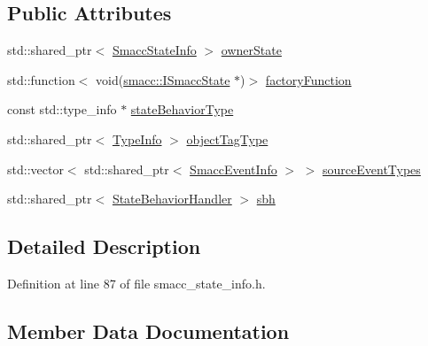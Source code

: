 \subsection*{Public Attributes}
\begin{DoxyCompactItemize}
\item 
std\+::shared\+\_\+ptr$<$ \hyperlink{classsmacc_1_1introspection_1_1SmaccStateInfo}{Smacc\+State\+Info} $>$ \hyperlink{structsmacc_1_1introspection_1_1SmaccStateBehaviorInfo_a3a8978a085abb4e649ac4d3a13bd8257}{owner\+State}
\item 
std\+::function$<$ void(\hyperlink{classsmacc_1_1ISmaccState}{smacc\+::\+I\+Smacc\+State} $\ast$)$>$ \hyperlink{structsmacc_1_1introspection_1_1SmaccStateBehaviorInfo_a966cf5a5fe5cbe839be792b04e6c7368}{factory\+Function}
\item 
const std\+::type\+\_\+info $\ast$ \hyperlink{structsmacc_1_1introspection_1_1SmaccStateBehaviorInfo_a85dc84a01fbd0b830ed6598996c4a7c9}{state\+Behavior\+Type}
\item 
std\+::shared\+\_\+ptr$<$ \hyperlink{classsmacc_1_1introspection_1_1TypeInfo}{Type\+Info} $>$ \hyperlink{structsmacc_1_1introspection_1_1SmaccStateBehaviorInfo_ae853ad3a28609fd83aa3d395d2e4c163}{object\+Tag\+Type}
\item 
std\+::vector$<$ std\+::shared\+\_\+ptr$<$ \hyperlink{structsmacc_1_1introspection_1_1SmaccEventInfo}{Smacc\+Event\+Info} $>$ $>$ \hyperlink{structsmacc_1_1introspection_1_1SmaccStateBehaviorInfo_af4ad563a4b9ed8951ddd33732d466cf4}{source\+Event\+Types}
\item 
std\+::shared\+\_\+ptr$<$ \hyperlink{classsmacc_1_1introspection_1_1StateBehaviorHandler}{State\+Behavior\+Handler} $>$ \hyperlink{structsmacc_1_1introspection_1_1SmaccStateBehaviorInfo_a023a46dffcf0dc85c90281783a1c8dff}{sbh}
\end{DoxyCompactItemize}


\subsection{Detailed Description}


Definition at line 87 of file smacc\+\_\+state\+\_\+info.\+h.



\subsection{Member Data Documentation}
